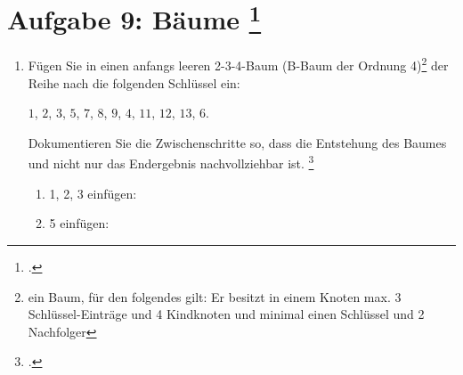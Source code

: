 \documentclass{lehramt-informatik-aufgabe}
\begin{document}

\section{Aufgabe 9: Bäume
\footcite[entnommen aus Algorithmen und
Datenstrukturen, Übungsblatt 6, Universität Würzburg]{aud:pu:7}}

\begin{enumerate}


\item Fügen Sie in einen anfangs leeren 2-3-4-Baum (B-Baum der Ordnung
4)\footnote{ein Baum, für den folgendes gilt: Er besitzt in einem Knoten
max. 3 Schlüssel-Einträge und 4 Kindknoten und minimal einen Schlüssel
und 2 Nachfolger} der Reihe nach die folgenden Schlüssel ein:

\centerline{$1$, $2$, $3$, $5$, $7$, $8$, $9$, $4$, $11$, $12$, $13$, $6$.}

Dokumentieren Sie die Zwischenschritte so,
dass die Entstehung des Baumes und nicht nur das Endergebnis
nachvollziehbar ist. \footcite[Staatsexamen Theoretische Informatik,
Algorithmen und Datenstrukturen, Realschulen, Frühjahr 2011, Thema 1
Aufgabe 3]{examen:46115:2011:03}

\begin{antwort}
\begin{multicols}{2}
\begin{enumerate}

%

\item 1, 2, 3 einfügen:


%

\item 5 einfügen:



\end{enumerate}
\end{multicols}
\end{antwort}
\end{enumerate}
\end{document}

